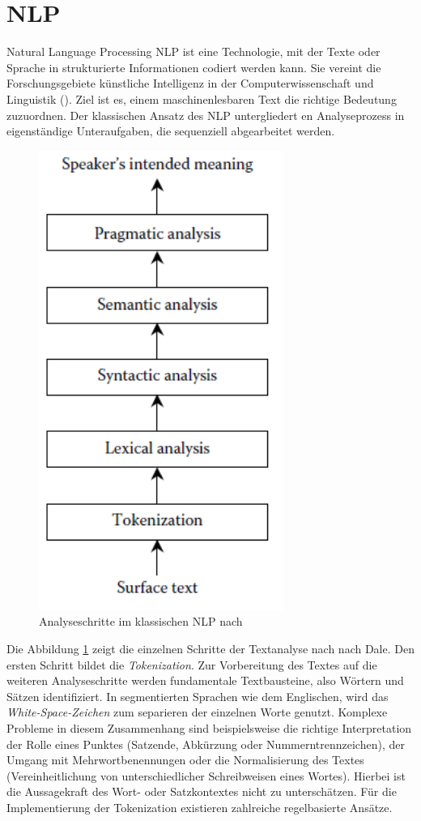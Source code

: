 \section{NLP}

Natural Language Processing \ac{NLP} ist eine Technologie, mit der Texte oder Sprache in strukturierte Informationen codiert werden kann. Sie vereint die Forschungsgebiete künstliche Intelligenz in der Computerwissenschaft und Linguistik (\cite[vgl.][1]{ITWISSEN}). Ziel ist es, einem maschinenlesbaren Text die richtige Bedeutung zuzuordnen. 
Der klassischen Ansatz des \ac{NLP} untergliedert en Analyseprozess in eigenständige Unteraufgaben, die sequenziell abgearbeitet werden.

\begin{figure}

\includegraphics[width=8cm]{pictures/Analyseschritte.png}
\caption{Analyseschritte im klassischen NLP nach \cite[vgl.][4]{DALE}}
\label{fig:STEPS}
\end{figure}


Die Abbildung \ref{fig:STEPS} zeigt die einzelnen Schritte der Textanalyse nach nach Dale. Den ersten Schritt bildet die \textit{Tokenization}. Zur Vorbereitung des Textes auf die weiteren Analyseschritte werden fundamentale Textbausteine, also Wörtern und Sätzen identifiziert. In segmentierten Sprachen wie dem Englischen, wird das \textit{White-Space-Zeichen} zum separieren der einzelnen Worte genutzt. Komplexe Probleme in diesem Zusammenhang sind beispielsweise die richtige Interpretation der Rolle eines Punktes (Satzende, Abkürzung oder Nummerntrennzeichen), der Umgang mit Mehrwortbenennungen oder die Normalisierung des Textes (Vereinheitlichung von unterschiedlicher Schreibweisen eines Wortes). Hierbei ist die Aussagekraft des Wort- oder Satzkontextes nicht zu unterschätzen. Für die Implementierung der Tokenization existieren zahlreiche regelbasierte Ansätze.

